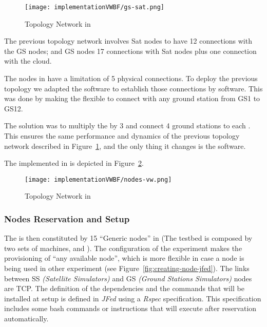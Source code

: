 \begin{figure}[!h]
\begin{center}
\texttt{[image: implementationVWBF/gs-sat.png]}

\caption{Topology Network in \vw}
\label{fig:impl-topology-vw}
\end{center}
\end{figure}



The previous topology network involves Sat nodes to have 12 connections with the GS nodes; and GS nodes 17 connections with Sat nodes plus one connection with the \bonfire cloud.

The nodes in \vw have a limitation of 5 physical connections. To deploy the previous
topology we adapted the \sss software to establish those connections by software. This was
done by making the \satss flexible to connect with any ground station from GS1 to GS12. 

The solution was to multiply the \satss by 3 and connect 4 ground stations to each \satss. This ensures the same performance and dynamics of the previous topology network described in Figure~\ref{fig:impl-topology-vw}, and the only thing it changes is the software.

The \sss implemented in \vw is depicted in Figure~\ref{fig:impl-nodes-vw}.

\begin{figure}[!h]
\begin{center}
\texttt{[image: implementationVWBF/nodes-vw.png]}

\caption{Topology Network in \vw}
\label{fig:impl-nodes-vw}
\end{center}
\end{figure}



\subsubsection{Nodes Reservation and Setup}

The \sss is then constituted by 15 ``Generic nodes'' in  (The \vw
testbed is composed by two sets of machines,  and ). The configuration of the experiment makes the provisioning of ``any available node'',
which is more flexible in case a node is being used in other experiment (see Figure~\ref{fig:creating-node-jfed}). The links between SS \emph{(Satellite Simulators)} and GS \emph{(Ground Stations Simulators)} nodes
are \ac{TCP}. The definition of the dependencies and the commands that will be installed at
setup is defined in \emph{JFed} using a \emph{Rspec} specification. This specification includes some
bash commands or instructions that will execute after reservation automatically.


